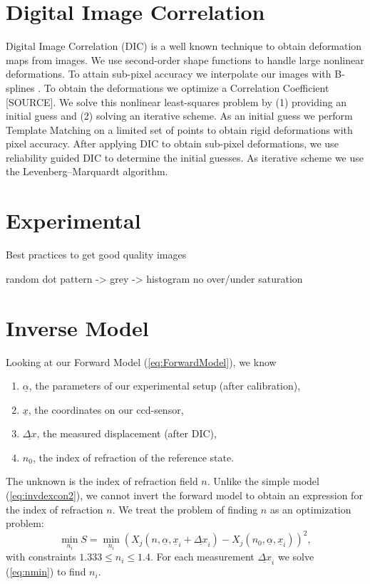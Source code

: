 \documentclass{article}
\begin{document}
\section{Digital Image Correlation}
Digital Image Correlation (DIC) is a well known technique \cite{sutton2009image} to obtain deformation maps from images. We use second-order shape functions \cite{lu2000deformation} to handle large nonlinear deformations. To attain sub-pixel accuracy we interpolate our images with B-splines \cite{thevenaz2000interpolation, unser1999splines, thevenaz2000image}. To obtain the deformations we optimize a Correlation Coefficient [SOURCE]. We solve this nonlinear least-squares problem  by (1) providing an initial guess and (2) solving an iterative scheme. As an initial guess we perform Template Matching \cite{lewis1995industrial,opencv_library} on a limited set of points to obtain rigid deformations with pixel accuracy. After applying DIC to obtain sub-pixel deformations, we use reliability guided DIC \cite{pan2012incremental} to determine the initial guesses. As iterative scheme we use the Levenberg–Marquardt algorithm. 

\section{Experimental}
Best practices to get good quality images

random dot pattern -> grey -> histogram no over/under saturation 

\section{Inverse Model}
Looking at our Forward Model (\ref{eq:ForwardModel}), we know
\begin{enumerate}
	\item $\underline{\alpha}$, the parameters of our experimental setup (after calibration), 
	\item $\underline{x}$, the coordinates on our ccd-sensor, 
	\item $\underline{\Delta x}$, the measured displacement (after DIC), 
	\item $n_0$, the index of refraction of the reference state.
\end{enumerate}
The unknown is the index of refraction field $n$. Unlike the simple model (\ref{eq:invdexcon2}), we cannot invert the forward model to obtain an expression for the index of refraction $n$. We treat the problem of finding $n$ as an optimization problem:
\begin{equation}
\label{eq:nmin} 
\min_{n_i}  S = \min_{n_i} (X_{j}(n, \underline{\alpha}, \underline{x}_i+\underline{\Delta x}_i) - X_{j}(n_0, \underline{\alpha}, \underline{x}_i))^2, 
\end{equation}
with constraints $1.333 \leq n_i \leq 1.4$. For each measurement $\underline{\Delta x}_i$ we solve (\ref{eq:nmin}) to find $n_i$.
\end{document}
